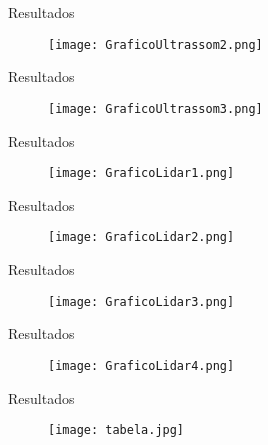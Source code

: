 \documentclass{beamer}
\begin{document}
\begin{frame}{Resultados}
    
     \begin{figure}
  \texttt{[image: GraficoUltrassom2.png]}
\end{figure}
    
\end{frame}
\begin{frame}{Resultados}
    
     \begin{figure}
  \texttt{[image: GraficoUltrassom3.png]}
\end{figure}
    
\end{frame}
\begin{frame}{Resultados}
    
     \begin{figure}
  \texttt{[image: GraficoLidar1.png]}
\end{figure}
    
\end{frame}
\begin{frame}{Resultados}
    
     \begin{figure}
  \texttt{[image: GraficoLidar2.png]}
\end{figure}
    
\end{frame}
\begin{frame}{Resultados}
    
     \begin{figure}
  \texttt{[image: GraficoLidar3.png]}
\end{figure}
    
\end{frame}
\begin{frame}{Resultados}
    
     \begin{figure}
  \texttt{[image: GraficoLidar4.png]}
\end{figure}
    
\end{frame}

\begin{frame}{Resultados}
    
     \begin{figure}
  \texttt{[image: tabela.jpg]}
\end{figure}
    
\end{frame}
\end{document}
